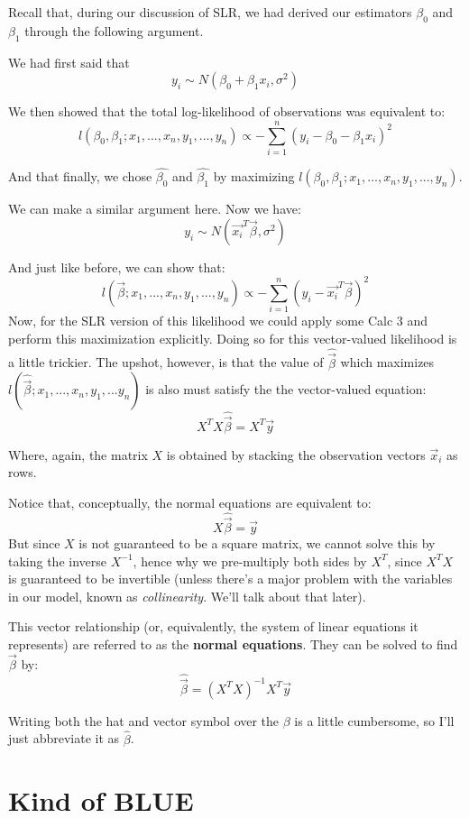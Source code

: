 \documentclass[
]{article}
\begin{document}
Recall that, during our discussion of SLR, we had derived our estimators
\(\beta_0\) and \(\beta_1\) through the following argument.

We had first said that \[
y_i \sim N(\beta_0 + \beta_1 x_i, \sigma^2)
\]

We then showed that the total log-likelihood of observations was
equivalent to: \[
l(\beta_0,\beta_1; x_1,...,x_n, y_1,...,y_n) \propto - \sum\limits_{i=1}^n (y_i - \beta_0 - \beta_1 x_i)^2
\]

And that finally, we chose \(\hat{\beta_0}\) and \(\hat{\beta_1}\) by
maximizing \(l(\beta_0,\beta_1; x_1,...,x_n, y_1,...,y_n)\).

We can make a similar argument here. Now we have: \[
y_i \sim N(\vec{x_i}^T \vec{\beta}, \sigma^2)
\]

And just like before, we can show that: \[
l(\vec{\beta}; x_1,...,x_n, y_1,...,y_n) \propto - \sum\limits_{i=1}^n (y_i - \vec{x_i}^T \vec{\beta})^2
\] Now, for the SLR version of this likelihood we could apply some Calc
3 and perform this maximization explicitly. Doing so for this
vector-valued likelihood is a little trickier. The upshot, however, is
that the value of \(\hat{\vec{\beta}}\) which maximizes
\(l(\hat{\vec{\beta}};x_1,...,x_n,y_1,...y_n)\) is also must satisfy the
the vector-valued equation: \[
X^TX \hat{\vec{\beta}} = X^T \vec{y}
\]

Where, again, the matrix \(X\) is obtained by stacking the observation
vectors \(\vec{x}_i\) as rows.

Notice that, conceptually, the normal equations are equivalent to: \[
X \hat{\vec{\beta}}= \vec{y}
\] But since \(X\) is not guaranteed to be a square matrix, we cannot
solve this by taking the inverse \(X^{-1}\), hence why we pre-multiply
both sides by \(X^T\), since \(X^TX\) is guaranteed to be invertible
(unless there's a major problem with the variables in our model, known
as \emph{collinearity}. We'll talk about that later).

This vector relationship (or, equivalently, the system of linear
equations it represents) are referred to as the \textbf{normal
equations}. They can be solved to find \(\vec{\beta}\) by: \[
\hat{\vec{\beta}} = (X^TX)^{-1} X^T \vec{y}
\]

Writing both the hat and vector symbol over the \(\beta\) is a little
cumbersome, so I'll just abbreviate it as \(\hat{\beta}\).

\hypertarget{kind-of-blue}{%
\section{Kind of BLUE}\label{kind-of-blue}}
\end{document}
